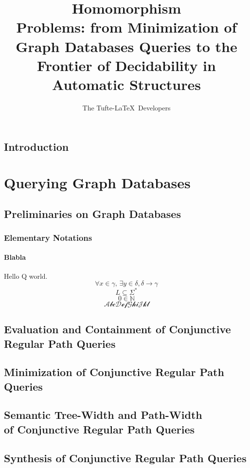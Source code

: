 \documentclass[a4paper,sfsidenotes,twoside,justified]{tufte-book-custom}
\title[On Homomorphism Problems]{ Homomorphism\\ Problems: from Minimization of Graph Databases Queries to the Frontier of Decidability in Automatic Structures}
\author[The Tufte-LaTeX Developers]{The Tufte-LaTeX\ Developers}
\begin{document}
\frontmatter





\mainmatter
\chapter{Introduction}

\part{Querying Graph Databases}

\chapter{Preliminaries on Graph Databases}

\section{Elementary Notations}

\subsection{Blabla}

Hello Q world.
\[\forall x \in \gamma,\, \exists y\in \delta, \delta \to \gamma\]
\[L \subseteq \Sigma^*\]
\[0 \in \mathbb{N}\]
\[\mathcal{AbcDefGhiJkl}\]

\lipsum[1-10]

\chapter{Evaluation and Containment of Conjunctive Regular Path Queries}

\chapter{Minimization of Conjunctive Regular Path Queries}

\chapter[{Semantic Tree-Width and Path-Width of Conjunctive Regular Path Queries}]{Semantic Tree-Width and Path-Width\\of Conjunctive Regular Path Queries}

\chapter{Synthesis of Conjunctive Regular Path Queries}
\end{document}
